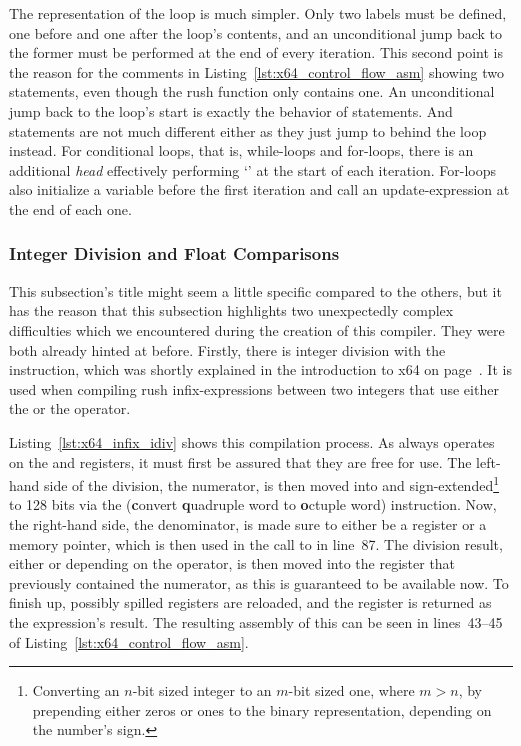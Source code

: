 The representation of the loop is much simpler.
Only two labels must be defined, one before and one after the loop's contents, and an unconditional jump back to the former must be performed at the end of every iteration.
This second point is the reason for the comments in Listing~\ref{lst:x64_control_flow_asm} showing two  statements, even though the rush function only contains one.
An unconditional jump back to the loop's start is exactly the behavior of  statements.
And  statements are not much different either as they just jump to behind the loop instead.
For conditional loops, that is, while-loops and for-loops, there is an additional \emph{head} effectively performing `' at the start of each iteration.
For-loops also initialize a variable before the first iteration and call an update-expression at the end of each one.

\subsubsection{Integer Division and Float Comparisons}

This subsection's title might seem a little specific compared to the others, but it has the reason that this subsection highlights two unexpectedly complex difficulties which we encountered during the creation of this compiler.
They were both already hinted at before.
Firstly, there is integer division with the  instruction, which was shortly explained in the introduction to x64 on page~\pageref{x64_idiv}.
It is used when compiling rush infix-expressions between two integers that use either the \qVerb{/} or the \qVerbCmd{\%} operator.


Listing~\ref{lst:x64_infix_idiv} shows this compilation process.
As  always operates on the  and  registers, it must first be assured that they are free for use.
The left-hand side of the division, the numerator, is then moved into  and sign-extended\footnote{Converting an $n$-bit sized integer to an $m$-bit sized one, where $m>n$, by prepending either zeros or ones to the binary representation, depending on the number's sign.} to 128 bits via the  (\textbf{c}onvert \textbf{q}uadruple word to \textbf{o}ctuple word) instruction.
Now, the right-hand side, the denominator, is made sure to either be a register or a memory pointer, which is then used in the call to  in line~87.
The division result, either  or  depending on the operator, is then moved into the register that previously contained the numerator, as this is guaranteed to be available now.
To finish up, possibly spilled registers are reloaded, and the register is returned as the expression's result.
The resulting assembly of this can be seen in lines~43--45 of Listing~\ref{lst:x64_control_flow_asm}.

